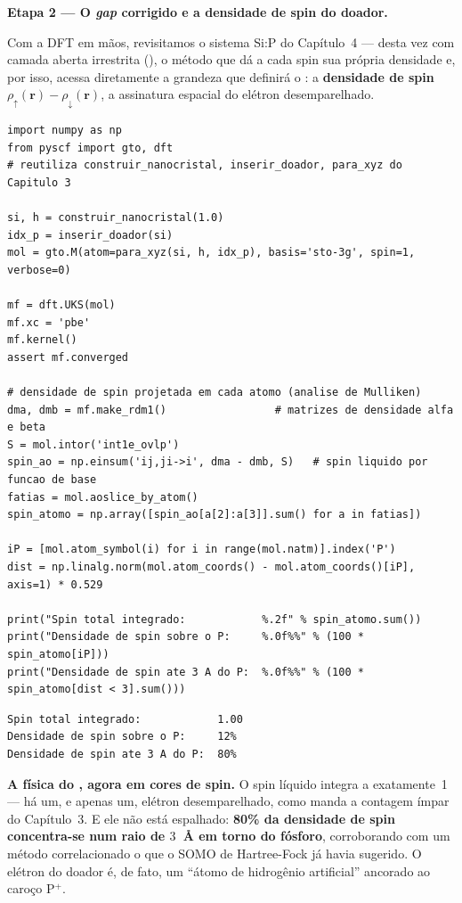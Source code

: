 \begin{caixaancora}
\textbf{Etapa 2 --- O \emph{gap} corrigido e a densidade de spin do doador.}

Com a DFT em mãos, revisitamos o sistema Si:P do Capítulo~4 --- desta vez com
camada aberta irrestrita (), o método que dá a cada spin sua própria
densidade e, por isso, acessa diretamente a grandeza que definirá o \qubit{}: a
\textbf{densidade de spin} $\rho_\uparrow(\mathbf{r}) - \rho_\downarrow(\mathbf{r})$,
a assinatura espacial do elétron desemparelhado.

\begin{lstlisting}[style=python]
import numpy as np
from pyscf import gto, dft
# reutiliza construir_nanocristal, inserir_doador, para_xyz do Capitulo 3

si, h = construir_nanocristal(1.0)
idx_p = inserir_doador(si)
mol = gto.M(atom=para_xyz(si, h, idx_p), basis='sto-3g', spin=1, verbose=0)

mf = dft.UKS(mol)
mf.xc = 'pbe'
mf.kernel()
assert mf.converged

# densidade de spin projetada em cada atomo (analise de Mulliken)
dma, dmb = mf.make_rdm1()                 # matrizes de densidade alfa e beta
S = mol.intor('int1e_ovlp')
spin_ao = np.einsum('ij,ji->i', dma - dmb, S)   # spin liquido por funcao de base
fatias = mol.aoslice_by_atom()
spin_atomo = np.array([spin_ao[a[2]:a[3]].sum() for a in fatias])

iP = [mol.atom_symbol(i) for i in range(mol.natm)].index('P')
dist = np.linalg.norm(mol.atom_coords() - mol.atom_coords()[iP], axis=1) * 0.529

print("Spin total integrado:            %.2f" % spin_atomo.sum())
print("Densidade de spin sobre o P:     %.0f%%" % (100 * spin_atomo[iP]))
print("Densidade de spin ate 3 A do P:  %.0f%%" % (100 * spin_atomo[dist < 3].sum()))
\end{lstlisting}

\begin{lstlisting}[style=console]
Spin total integrado:            1.00
Densidade de spin sobre o P:     12%
Densidade de spin ate 3 A do P:  80%
\end{lstlisting}

\textbf{A física do \qubit{}, agora em cores de spin.} O spin líquido integra a
exatamente~1 --- há um, e apenas um, elétron desemparelhado, como manda a contagem
ímpar do Capítulo~3. E ele não está espalhado: \textbf{80\% da densidade de spin
concentra-se num raio de $3$~Å em torno do fósforo}, corroborando com um método
correlacionado o que o SOMO de Hartree-Fock já havia sugerido. O elétron do doador
é, de fato, um ``átomo de hidrogênio artificial'' ancorado ao caroço P$^+$.


\end{caixaancora}
